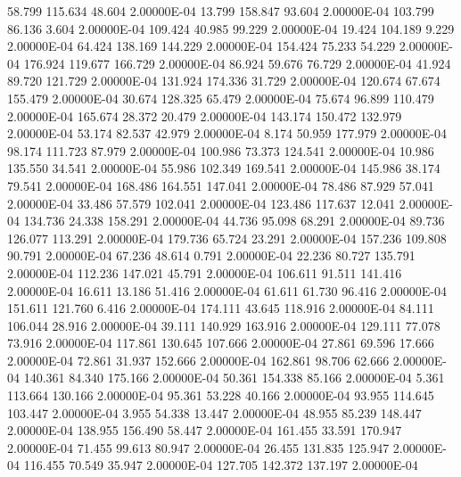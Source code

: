     58.799   115.634    48.604  2.00000E-04
    13.799   158.847    93.604  2.00000E-04
   103.799    86.136     3.604  2.00000E-04
   109.424    40.985    99.229  2.00000E-04
    19.424   104.189     9.229  2.00000E-04
    64.424   138.169   144.229  2.00000E-04
   154.424    75.233    54.229  2.00000E-04
   176.924   119.677   166.729  2.00000E-04
    86.924    59.676    76.729  2.00000E-04
    41.924    89.720   121.729  2.00000E-04
   131.924   174.336    31.729  2.00000E-04
   120.674    67.674   155.479  2.00000E-04
    30.674   128.325    65.479  2.00000E-04
    75.674    96.899   110.479  2.00000E-04
   165.674    28.372    20.479  2.00000E-04
   143.174   150.472   132.979  2.00000E-04
    53.174    82.537    42.979  2.00000E-04
     8.174    50.959   177.979  2.00000E-04
    98.174   111.723    87.979  2.00000E-04
   100.986    73.373   124.541  2.00000E-04
    10.986   135.550    34.541  2.00000E-04
    55.986   102.349   169.541  2.00000E-04
   145.986    38.174    79.541  2.00000E-04
   168.486   164.551   147.041  2.00000E-04
    78.486    87.929    57.041  2.00000E-04
    33.486    57.579   102.041  2.00000E-04
   123.486   117.637    12.041  2.00000E-04
   134.736    24.338   158.291  2.00000E-04
    44.736    95.098    68.291  2.00000E-04
    89.736   126.077   113.291  2.00000E-04
   179.736    65.724    23.291  2.00000E-04
   157.236   109.808    90.791  2.00000E-04
    67.236    48.614     0.791  2.00000E-04
    22.236    80.727   135.791  2.00000E-04
   112.236   147.021    45.791  2.00000E-04
   106.611    91.511   141.416  2.00000E-04
    16.611    13.186    51.416  2.00000E-04
    61.611    61.730    96.416  2.00000E-04
   151.611   121.760     6.416  2.00000E-04
   174.111    43.645   118.916  2.00000E-04
    84.111   106.044    28.916  2.00000E-04
    39.111   140.929   163.916  2.00000E-04
   129.111    77.078    73.916  2.00000E-04
   117.861   130.645   107.666  2.00000E-04
    27.861    69.596    17.666  2.00000E-04
    72.861    31.937   152.666  2.00000E-04
   162.861    98.706    62.666  2.00000E-04
   140.361    84.340   175.166  2.00000E-04
    50.361   154.338    85.166  2.00000E-04
     5.361   113.664   130.166  2.00000E-04
    95.361    53.228    40.166  2.00000E-04
    93.955   114.645   103.447  2.00000E-04
     3.955    54.338    13.447  2.00000E-04
    48.955    85.239   148.447  2.00000E-04
   138.955   156.490    58.447  2.00000E-04
   161.455    33.591   170.947  2.00000E-04
    71.455    99.613    80.947  2.00000E-04
    26.455   131.835   125.947  2.00000E-04
   116.455    70.549    35.947  2.00000E-04
   127.705   142.372   137.197  2.00000E-04
